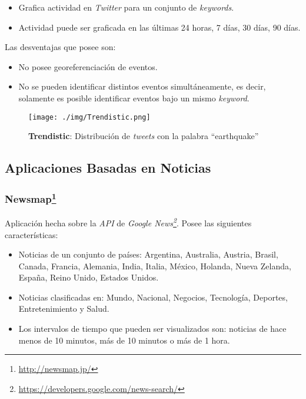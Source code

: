 \documentclass[10pt]{article}
\begin{document}
	\begin{itemize}
		\item Grafica actividad en \emph{Twitter} para un conjunto de \emph{keywords}.
		\item Actividad puede ser graficada en las últimas 24 horas, 7 días, 30 días, 90 días.
	\end{itemize}

	Las desventajas que posee son:

	\begin{itemize}
		\item No posee georeferenciación de eventos.
		\item No se pueden identificar distintos eventos simultáneamente, es decir, solamente es posible identificar eventos bajo un mismo \emph{keyword}.
	\end{itemize}

	\begin{figure}[h!]
		\centering
	    \texttt{[image: ./img/Trendistic.png]}
		\caption{\textbf{Trendistic}: Distribución de \emph{tweets} con la palabra ``earthquake''}
		\label{trendistic}
	\end{figure}

\subsection{Aplicaciones Basadas en Noticias}
\subsubsection*{Newsmap\footnote{\url{http://newsmap.jp/}}}

	Aplicación hecha sobre la \emph{API} de \emph{Google News\footnote{\url{https://developers.google.com/news-search/}}}. Posee las siguientes características:

	\begin{itemize}
		\item Noticias de un conjunto de países: Argentina, Australia, Austria, Brasil, Canada, Francia, Alemania, India, Italia, México, Holanda, Nueva Zelanda, España, Reino Unido, Estados Unidos.
		\item Noticias clasificadas en: Mundo, Nacional, Negocios, Tecnología, Deportes, Entretenimiento y Salud.
		\item Los intervalos de tiempo que pueden ser visualizados son: noticias de hace menos de 10 minutos, más de 10 minutos o más de 1 hora.
	\end{itemize}
\end{document}
